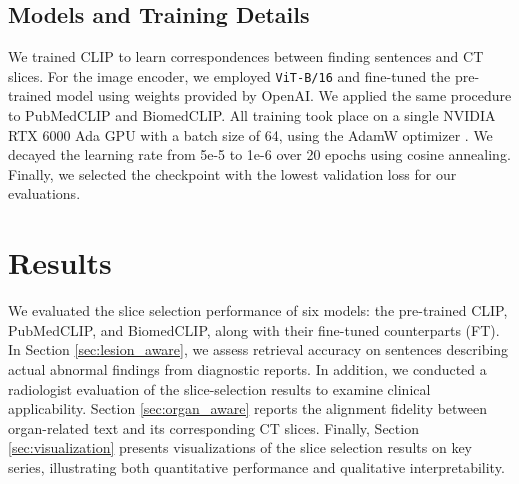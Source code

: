 \documentclass[bioengineering,article,submit,pdftex,moreauthors]{Definitions/mdpi}
\begin{document}
\subsection{Models and Training Details}
We trained CLIP to learn correspondences between finding sentences and CT slices. 
For the image encoder, we employed \texttt{ViT-B/16} and fine-tuned the pre-trained model using weights provided by OpenAI. 
We applied the same procedure to PubMedCLIP and BiomedCLIP.
All training took place on a single NVIDIA RTX 6000 Ada GPU with a batch size of 64, using the AdamW optimizer \cite{loshchilov_fixing_2017}. 
We decayed the learning rate from 5e-5 to 1e-6 over 20 epochs using cosine annealing. 
Finally, we selected the checkpoint with the lowest validation loss for our evaluations.


\section{Results}

We evaluated the slice selection performance of six models: the pre-trained CLIP, PubMedCLIP, and BiomedCLIP, along with their fine-tuned counterparts (FT). 
In Section \ref{sec:lesion_aware}, we assess retrieval accuracy on sentences describing actual abnormal findings from diagnostic reports. 
In addition, we conducted a radiologist evaluation of the slice-selection results to examine clinical applicability.
Section \ref{sec:organ_aware} reports the alignment fidelity between organ-related text and its corresponding CT slices. 
Finally, Section \ref{sec:visualization} presents visualizations of the slice selection results on key series, illustrating both quantitative performance and qualitative interpretability.
\end{document}
